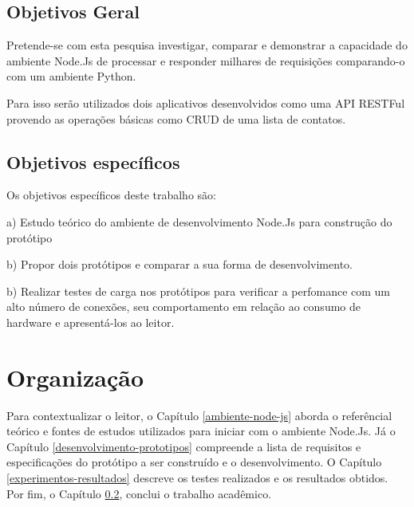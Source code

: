 \subsection{Objetivos Geral}

  Pretende-se com esta pesquisa investigar, comparar e demonstrar a capacidade 
  do ambiente Node.Js de processar e responder milhares de requisições comparando-o com um ambiente Python.
  
  Para isso serão utilizados dois aplicativos desenvolvidos como uma API RESTFul provendo as operações
  básicas como \ac{CRUD} de uma lista de contatos.
  
\subsection{Objetivos específicos}

  Os objetivos específicos deste trabalho são:
  
    \begin{compactitem}
      \item[a)] Estudo teórico do ambiente de desenvolvimento Node.Js para construção do protótipo 
      \item[b)] Propor dois protótipos e comparar a sua forma de desenvolvimento.
      \item[b)] Realizar testes de carga nos protótipos para verificar a perfomance com um alto número de conexões,
      seu comportamento em relação ao consumo de hardware e apresentá-los ao leitor.
    \end{compactitem}
  
  
\section{Organização}
\label{organizacao}  

  Para contextualizar o leitor, o Capítulo \ref{ambiente-node-js} aborda o referêncial teórico e fontes de estudos utilizados para iniciar com o ambiente 
  Node.Js. Já o Capítulo \ref{desenvolvimento-prototipos} compreende a lista de requisitos e especificações do protótipo a ser construído e o
  desenvolvimento. O Capítulo \ref{experimentos-resultados} descreve os testes realizados e os resultados obtidos. 
  Por fim, o Capítulo \ref{}, conclui o trabalho acadêmico.